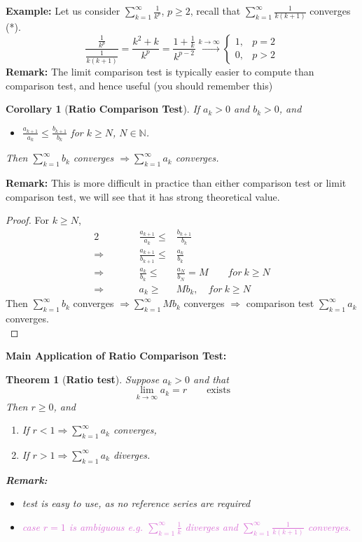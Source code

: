 \documentclass[12pt]{article}
\theoremstyle{plain}
\newtheorem{theorem}{Theorem}[subsection]
\newtheorem{corollary}{Corollary}[subsection]
\newcommand{\mN}{{\mathbb{N}}}
\begin{document}
{\color{Brown}
\textbf{Example: }
Let us consider $\sum_{k=1}^{\infty} \frac1{k^p}$, $p \geq 2$, recall that
$\sum_{k=1}^{\infty} \frac1{k(k+1)}$ converges (*). 
\[
	\frac{\frac 1{k^p}}{\frac{1}{k(k+1)}} 
	=\frac{k^2+k}{k^p} 
	=\frac{1+\frac 1k}{k^{p-2}} \overset{k\to\infty}{\rightarrow}
	\begin{cases}
		1,	& p = 2	\\
		0,	& p > 2
	\end{cases}
\]
}
\textbf{Remark: }The limit comparison test is typically easier to compute than
comparison test, and hence useful (you should remember this)\\


\begin{corollary}[\textbf{Ratio Comparison Test}]
	If $a_k > 0$ and $b_k > 0$, and 
	\begin{itemize}
		\item $\frac{a_{k+1}}{a_k} \leq \frac{b_{k+1}}{b_k}$ for 
			$k \geq N$, $N \in \mN$. 
	\end{itemize}
	Then $\sum_{k=1}^{\infty}b_k$ converges $\Rightarrow \sum_{k=1}^{\infty}
	a_k$ converges. 
\end{corollary}
\textbf{Remark:} This is more difficult in practice than either comparison
test or limit comparison test, we will see that it has strong theoretical value.
\begin{proof}
	For $k \geq N$, 
	\begin{alignat*}{2}
		& & \frac{a_{k+1}}{a_k} \leq& \frac{b_{k+1}}{b_k}		\\
		\Rightarrow & \qquad & \frac{a_{k+1}}{b_{k+1}} \leq&\frac{a_k}{b_k}	\\
		\Rightarrow & \qquad & \frac{a_k}{b_k} \leq &\frac{a_N}{b_N} = M
		\qquad for \ k \geq N	\\
		\Rightarrow & \qquad & a_k \geq& Mb_k, \quad for\ k \geq N
	\end{alignat*}
	Then $\sum_{k=1}^{\infty} b_k$ converges 
	$\Rightarrow \sum_{k=1}^{\infty} Mb_k$ converges $\Rightarrow$ 
	comparison test $\sum_{k=1}^{\infty} a_k$ converges.	\\
\end{proof}

\textbf{Main Application of Ratio Comparison Test: }
\begin{theorem}[\textbf{Ratio test}]
	Suppose $a_k > 0$ and that 
	\[
		\lim_{k\to\infty} a_k = r \qquad \text{exists}
	\]
	Then $r \geq 0$, and 
	\begin{enumerate}
		\item If $r < 1 \Rightarrow \sum_{k=1}^{\infty} a_k$ converges,
		\item If $r > 1 \Rightarrow \sum_{k=1}^{\infty} a_k$ diverges.  
	\end{enumerate}
	\textbf{Remark:}
	\begin{itemize}
		\item test is easy to use, as no reference series are required
		\item \textcolor{Orchid}{case $r=1$ is ambiguous
			e.g. $\sum_{k=1}^{\infty} \frac1{k}$ diverges and 
		$\sum_{k=1}^{\infty} \frac1{k(k+1)}$ converges.} 
	\end{itemize}
\end{theorem}
\end{document}
